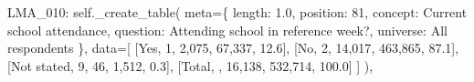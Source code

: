 \documentclass[
  11pt,
  a4paper,
]{article}
\newenvironment{Shaded}{\begin{snugshade}}{\end{snugshade}}
\newcommand{\NormalTok}[1]{\textcolor[rgb]{0.00,0.23,0.31}{#1}}
\newcommand{\OperatorTok}[1]{\textcolor[rgb]{0.37,0.37,0.37}{#1}}
\newcommand{\StringTok}[1]{\textcolor[rgb]{0.13,0.47,0.30}{#1}}
\newcommand{\VariableTok}[1]{\textcolor[rgb]{0.07,0.07,0.07}{#1}}
\begin{document}
\begin{Shaded}
\begin{Highlighting}[]
            \StringTok{\textquotesingle{}LMA\_010\textquotesingle{}}\NormalTok{: }\VariableTok{self}\NormalTok{.\_create\_table(}
\NormalTok{                meta}\OperatorTok{=}\NormalTok{\{}
                    \StringTok{\textquotesingle{}length\textquotesingle{}}\NormalTok{: }\StringTok{\textquotesingle{}1.0\textquotesingle{}}\NormalTok{, }\StringTok{\textquotesingle{}position\textquotesingle{}}\NormalTok{: }\StringTok{\textquotesingle{}81\textquotesingle{}}\NormalTok{,}
                    \StringTok{\textquotesingle{}concept\textquotesingle{}}\NormalTok{: }\StringTok{\textquotesingle{}Current school attendance\textquotesingle{}}\NormalTok{,}
                    \StringTok{\textquotesingle{}question\textquotesingle{}}\NormalTok{: }\StringTok{\textquotesingle{}Attending school in reference week?\textquotesingle{}}\NormalTok{,}
                    \StringTok{\textquotesingle{}universe\textquotesingle{}}\NormalTok{: }\StringTok{\textquotesingle{}All respondents\textquotesingle{}}
\NormalTok{                \},}
\NormalTok{                data}\OperatorTok{=}\NormalTok{[}
\NormalTok{                    [}\StringTok{\textquotesingle{}Yes\textquotesingle{}}\NormalTok{, }\StringTok{\textquotesingle{}1\textquotesingle{}}\NormalTok{, }\StringTok{\textquotesingle{}2,075\textquotesingle{}}\NormalTok{, }\StringTok{\textquotesingle{}67,337\textquotesingle{}}\NormalTok{, }\StringTok{\textquotesingle{}12.6\textquotesingle{}}\NormalTok{],}
\NormalTok{                    [}\StringTok{\textquotesingle{}No\textquotesingle{}}\NormalTok{, }\StringTok{\textquotesingle{}2\textquotesingle{}}\NormalTok{, }\StringTok{\textquotesingle{}14,017\textquotesingle{}}\NormalTok{, }\StringTok{\textquotesingle{}463,865\textquotesingle{}}\NormalTok{, }\StringTok{\textquotesingle{}87.1\textquotesingle{}}\NormalTok{],}
\NormalTok{                    [}\StringTok{\textquotesingle{}Not stated\textquotesingle{}}\NormalTok{, }\StringTok{\textquotesingle{}9\textquotesingle{}}\NormalTok{, }\StringTok{\textquotesingle{}46\textquotesingle{}}\NormalTok{, }\StringTok{\textquotesingle{}1,512\textquotesingle{}}\NormalTok{, }\StringTok{\textquotesingle{}0.3\textquotesingle{}}\NormalTok{],}
\NormalTok{                    [}\StringTok{\textquotesingle{}Total\textquotesingle{}}\NormalTok{, }\StringTok{\textquotesingle{}\textquotesingle{}}\NormalTok{, }\StringTok{\textquotesingle{}16,138\textquotesingle{}}\NormalTok{, }\StringTok{\textquotesingle{}532,714\textquotesingle{}}\NormalTok{, }\StringTok{\textquotesingle{}100.0\textquotesingle{}}\NormalTok{]}
\NormalTok{                ]}
\NormalTok{            ),}
            

\end{Highlighting}
\end{Shaded}
\end{document}
